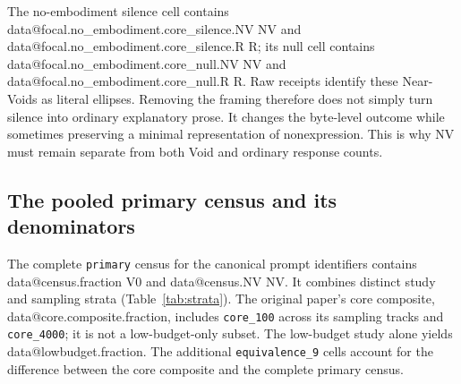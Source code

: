 \documentclass[11pt]{article}
\makeatletter
\newcommand{\D}[1]{\csname data@#1\endcsname}
\makeatother
\begin{document}
\begin{table}[H]
\centering\small

\caption{Primary setting-matched comparison. The full prompt yields \D{focal.primary.fraction} V0 versus \D{focal.ablations.fraction} across the tested ablations. Unequal sample sizes are explicit.}
\label{tab:aggregate}
\end{table}

\begin{table}[H]
\centering\small

\caption{Complete canonical prompt cells for the setting-matched comparison. Other includes every frozen outcome class outside V0, NV, and R, rather than silently excluding failures or alternative Void subtypes.}
\label{tab:focal}
\end{table}

The no-embodiment silence cell contains \D{focal.no_embodiment.core_silence.NV} NV and \D{focal.no_embodiment.core_silence.R} R; its null cell contains \D{focal.no_embodiment.core_null.NV} NV and \D{focal.no_embodiment.core_null.R} R. Raw receipts identify these Near-Voids as literal ellipses. Removing the framing therefore does not simply turn silence into ordinary explanatory prose. It changes the byte-level outcome while sometimes preserving a minimal representation of nonexpression. This is why NV must remain separate from both Void and ordinary response counts.

\subsection{The pooled primary census and its denominators}
The complete \texttt{primary} census for the canonical prompt identifiers contains \D{census.fraction} V0 and \D{census.NV} NV. It combines distinct study and sampling strata (Table~\ref{tab:strata}). The original paper's core composite, \D{core.composite.fraction}, includes \texttt{core\_100} across its sampling tracks and \texttt{core\_4000}; it is not a low-budget-only subset. The low-budget study alone yields \D{lowbudget.fraction}. The additional \texttt{equivalence\_9} cells account for the difference between the core composite and the complete primary census.

\begin{table}[H]
\centering\footnotesize
\setlength{\tabcolsep}{3.5pt}

\caption{Full-prompt census reconstructed by exact study and parameter-track filters. Silence, nothing, and null columns show V0/N. Every remaining outcome in these rows is NV. ``Temp. zero'' denotes an explicitly supplied temperature, whereas ``default'' denotes omission.}
\label{tab:strata}
\end{table}
\end{document}
